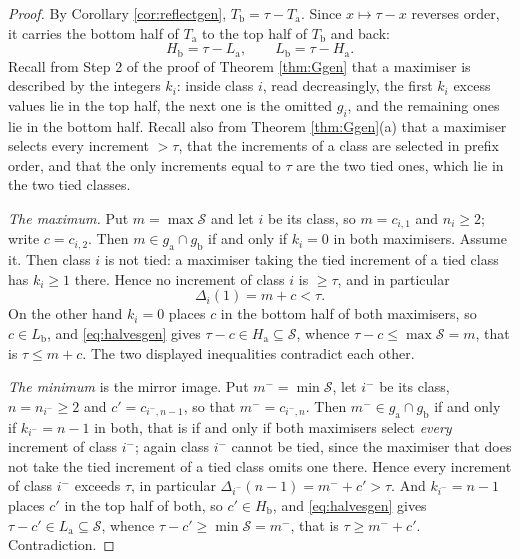 \documentclass[10pt,a4paper]{amsart}
\begin{document}
\begin{proof}
By Corollary \ref{cor:reflectgen}, $T_{\mathrm b}=\tau-T_{\mathrm a}$. Since $x\mapsto\tau-x$ reverses
order, it carries the bottom half of $T_{\mathrm a}$ to the top half of $T_{\mathrm b}$ and back:
\begin{equation}\label{eq:halvesgen}
  H_{\mathrm b}=\tau-L_{\mathrm a},\qquad L_{\mathrm b}=\tau-H_{\mathrm a}.
\end{equation}
Recall from Step 2 of the proof of Theorem \ref{thm:Ggen} that a maximiser is described by the
integers $k_i$: inside class $i$, read decreasingly, the first $k_i$ excess values lie in the top half,
the next one is the omitted $g_i$, and the remaining ones lie in the bottom half. Recall also from
Theorem \ref{thm:Ggen}(a) that a maximiser selects every increment $>\tau$, that the increments of a
class are selected in prefix order, and that the only increments equal to $\tau$ are the two tied ones,
which lie in the two tied classes.

\emph{The maximum.} Put $m=\max\mathcal{S}$ and let $i$ be its class, so $m=c_{i,1}$ and $n_i\ge2$;
write $c=c_{i,2}$. Then $m\in g_{\mathrm a}\cap g_{\mathrm b}$ if and only if $k_i=0$ in both
maximisers. Assume it. Then class $i$ is not tied: a maximiser taking the tied increment of a tied
class has $k_i\ge1$ there. Hence no increment of class $i$ is $\ge\tau$, and in particular
\[
  \Delta_i(1)=m+c<\tau .
\]
On the other hand $k_i=0$ places $c$ in the bottom half of both maximisers, so $c\in L_{\mathrm b}$,
and \eqref{eq:halvesgen} gives $\tau-c\in H_{\mathrm a}\subseteq\mathcal{S}$, whence
$\tau-c\le\max\mathcal{S}=m$, that is $\tau\le m+c$. The two displayed inequalities contradict each
other.

\emph{The minimum} is the mirror image. Put $m^{-}=\min\mathcal{S}$, let $i^{-}$ be its class,
$n=n_{i^{-}}\ge2$ and $c'=c_{i^{-},n-1}$, so that $m^{-}=c_{i^{-},n}$. Then
$m^{-}\in g_{\mathrm a}\cap g_{\mathrm b}$ if and only if $k_{i^{-}}=n-1$ in both, that is if and only
if both maximisers select \emph{every} increment of class $i^{-}$; again class $i^{-}$ cannot be tied,
since the maximiser that does not take the tied increment of a tied class omits one there. Hence every
increment of class $i^{-}$ exceeds $\tau$, in particular $\Delta_{i^{-}}(n-1)=m^{-}+c'>\tau$. And
$k_{i^{-}}=n-1$ places $c'$ in the top half of both, so $c'\in H_{\mathrm b}$, and
\eqref{eq:halvesgen} gives $\tau-c'\in L_{\mathrm a}\subseteq\mathcal{S}$, whence
$\tau-c'\ge\min\mathcal{S}=m^{-}$, that is $\tau\ge m^{-}+c'$. Contradiction.
\end{proof}
\end{document}
